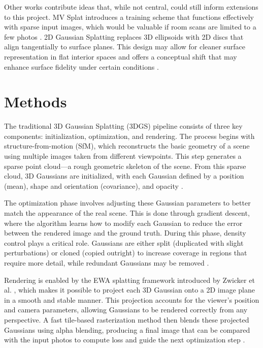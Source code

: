 \documentclass[10pt,twocolumn]{article}
\begin{document}
Other works contribute ideas that, while not central, could still inform extensions to this project. MV Splat introduces a training scheme that functions effectively with sparse input images, which would be valuable if room scans are limited to a few photos \cite{Chen_2024}. 2D Gaussian Splatting replaces 3D ellipsoids with 2D discs that align tangentially to surface planes. This design may allow for cleaner surface representation in flat interior spaces and offers a conceptual shift that may enhance surface fidelity under certain conditions \cite{Huang2DGS2024}.

\section{Methods}

The traditional 3D Gaussian Splatting (3DGS) pipeline consists of three key components: initialization, optimization, and rendering. The process begins with structure-from-motion (SfM), which reconstructs the basic geometry of a scene using multiple images taken from different viewpoints. This step generates a sparse point cloud—a rough geometric skeleton of the scene. From this sparse cloud, 3D Gaussians are initialized, with each Gaussian defined by a position (mean), shape and orientation (covariance), and opacity \cite{kerbl20233dgaussiansplattingrealtime}.

The optimization phase involves adjusting these Gaussian parameters to better match the appearance of the real scene. This is done through gradient descent, where the algorithm learns how to modify each Gaussian to reduce the error between the rendered image and the ground truth. During this phase, density control plays a critical role. Gaussians are either split (duplicated with slight perturbations) or cloned (copied outright) to increase coverage in regions that require more detail, while redundant Gaussians may be removed \cite{kerbl20233dgaussiansplattingrealtime}.

Rendering is enabled by the EWA splatting framework introduced by Zwicker et al. \cite{zwicker2002ewa}, which makes it possible to project each 3D Gaussian onto a 2D image plane in a smooth and stable manner. This projection accounts for the viewer’s position and camera parameters, allowing Gaussians to be rendered correctly from any perspective. A fast tile-based rasterization method then blends these projected Gaussians using alpha blending, producing a final image that can be compared with the input photos to compute loss and guide the next optimization step \cite{kerbl20233dgaussiansplattingrealtime}.
\end{document}
